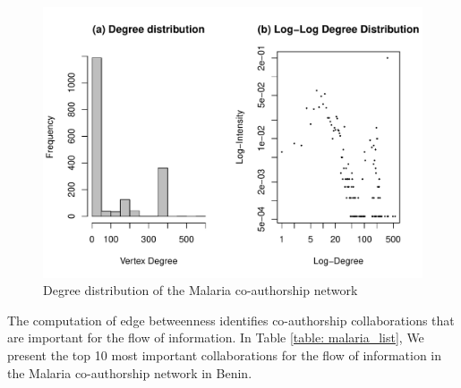 \begin{figure}[!ht]
\centering
\includegraphics[scale=0.75]{Chapters/malaria/degreeDistribution}
\caption{Degree distribution of the Malaria co-authorship network}
\label{malaria_fig1}
\end{figure}

The computation of edge betweenness identifies co-authorship collaborations that are important for the flow of information. In Table \ref{table: malaria_list}, We present the top 10 most important collaborations for the flow of information in the Malaria co-authorship network in Benin.

